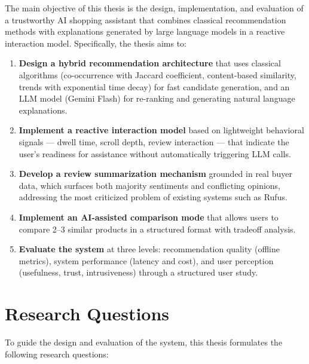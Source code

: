 \par The main objective of this thesis is the design, implementation, and evaluation of a trustworthy AI shopping assistant that combines classical recommendation methods with explanations generated by large language models in a reactive interaction model. Specifically, the thesis aims to:

\begin{enumerate}
  \item \textbf{Design a hybrid recommendation architecture} that uses classical algorithms (co-occurrence with Jaccard coefficient, content-based similarity, trends with exponential time decay) for fast candidate generation, and an LLM model (Gemini Flash) for re-ranking and generating natural language explanations.

  \item \textbf{Implement a reactive interaction model} based on lightweight behavioral signals --- dwell time, scroll depth, review interaction --- that indicate the user's readiness for assistance without automatically triggering LLM calls.

  \item \textbf{Develop a review summarization mechanism} grounded in real buyer data, which surfaces both majority sentiments and conflicting opinions, addressing the most criticized problem of existing systems such as Rufus.

  \item \textbf{Implement an AI-assisted comparison mode} that allows users to compare 2--3 similar products in a structured format with tradeoff analysis.

  \item \textbf{Evaluate the system} at three levels: recommendation quality (offline metrics), system performance (latency and cost), and user perception (usefulness, trust, intrusiveness) through a structured user study.
\end{enumerate}


\section{Research Questions}
\label{sec:intro-rq}

\par To guide the design and evaluation of the system, this thesis formulates the following research questions:

